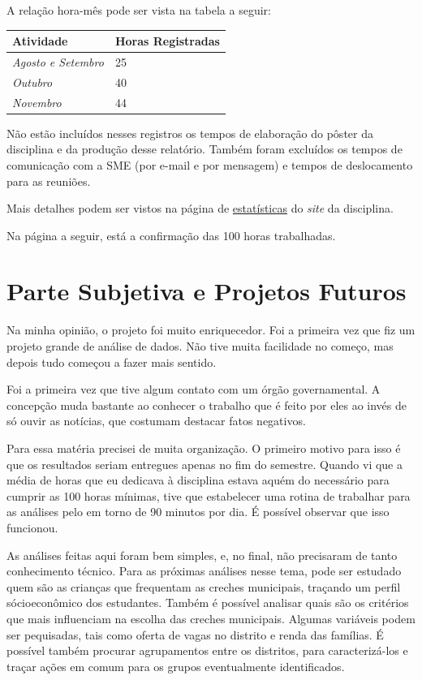 \documentclass[12pt, a4paper]{article}
\begin{document}
A relação hora-mês pode ser vista na tabela a seguir:

\begin{table}[H]
	\centering
	\begin{tabular}{l|l}
		\textbf{Atividade}                                   & \textbf{Horas Registradas} \\ \hline
		\textit{Agosto e Setembro} & 25                          \\ \hline
		\textit{Outubro}                           & 40                         \\ \hline
		\textit{Novembro}    & 44                         \\ 
	\end{tabular}
\end{table}

Não estão incluídos nesses registros os tempos de elaboração do pôster da disciplina e da produção desse relatório. Também foram excluídos os tempos de comunicação com a SME (por e-mail e por mensagem) e tempos de deslocamento para as reuniões. 

Mais detalhes podem ser vistos na página de \href{https://lsflp.github.io/MAC0213/estatisticas.html}{estatísticas} do \textit{site} da disciplina.

Na página a seguir, está a confirmação das 100 horas trabalhadas.



\section{Parte Subjetiva e Projetos Futuros}

Na minha opinião, o projeto foi muito enriquecedor. Foi a primeira vez que fiz um projeto grande de análise de dados. Não tive muita facilidade no começo, mas depois tudo começou a fazer mais sentido.

Foi a primeira vez que tive algum contato com um órgão governamental. A concepção muda bastante ao conhecer o trabalho que é feito por eles ao invés de só ouvir as notícias, que costumam destacar fatos negativos.

Para essa matéria precisei de muita organização. O primeiro motivo para isso é que os resultados seriam entregues apenas no fim do semestre. Quando vi que a média de horas que eu dedicava à disciplina estava aquém do necessário para cumprir as 100 horas mínimas, tive que estabelecer uma rotina de trabalhar para as análises pelo em torno de 90 minutos por dia. É possível observar que isso funcionou. 

As análises feitas aqui foram bem simples, e, no final, não precisaram de tanto conhecimento técnico. Para as próximas análises nesse tema, pode ser estudado quem são as crianças que frequentam as creches municipais, traçando um perfil sócioeconômico dos estudantes. Também é possível analisar quais são os critérios que mais influenciam na escolha das creches municipais. Algumas variáveis podem ser pequisadas, tais como oferta de vagas no distrito e renda das famílias. É possível também procurar agrupamentos entre os distritos, para caracterizá-los e traçar ações em comum para os grupos eventualmente identificados. 
\end{document}
